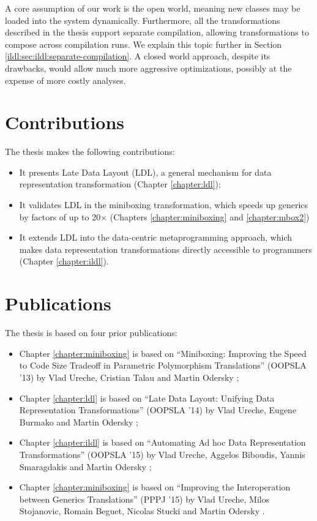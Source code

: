 A core assumption of our work is the open world, meaning new classes may be loaded into the system dynamically. Furthermore, all the transformations described in the thesis support separate compilation, allowing transformations to compose across compilation runs. We explain this topic further in Section \ref{ildl:sec:ildl:separate-compilation}. A closed world approach, despite its drawbacks, would allow much more aggressive optimizations, possibly at the expense of more costly analyses.

\newpage

\section{Contributions}

The thesis makes the following contributions:

\begin{itemize}
  \item It presents Late Data Layout (LDL), a general mechanism for data representation transformation (Chapter \ref{chapter:ldl});
  \item It validates LDL in the miniboxing transformation, which speeds up generics by factors of up to 20$\times$ (Chapters \ref{chapter:miniboxing} and \ref{chapter:mbox2})
  \item It extends LDL into the data-centric metaprogramming approach, which makes data representation transformations directly accessible to programmers (Chapter \ref{chapter:ildl}).
\end{itemize}

\section{Publications}

The thesis is based on four prior publications:

\begin{itemize}
  \item Chapter \ref{chapter:miniboxing} is based on ``Miniboxing: Improving the Speed to Code Size Tradeoff in Parametric Polymorphism Translations'' (OOPSLA '13) by Vlad Ureche, Cristian Talau and Martin Odersky \cite{miniboxing};
  \item Chapter \ref{chapter:ldl} is based on ``Late Data Layout: Unifying Data Representation Transformations'' (OOPSLA '14) by Vlad Ureche, Eugene Burmako and Martin Odersky \cite{ldl};
  \item Chapter \ref{chapter:ildl} is based on ``Automating Ad hoc Data Representation Transformations'' (OOPSLA '15) by Vlad Ureche, Aggelos Biboudis, Yannis Smaragdakis and Martin Odersky \cite{ildl-tech};
  \item Chapter \ref{chapter:miniboxing} is based on ``Improving the Interoperation between Generics Translations'' (PPPJ '15) by Vlad Ureche, Milos Stojanovic, Romain Beguet, Nicolas Stucki and Martin Odersky \cite{miniboxing-pppj}.
\end{itemize}

